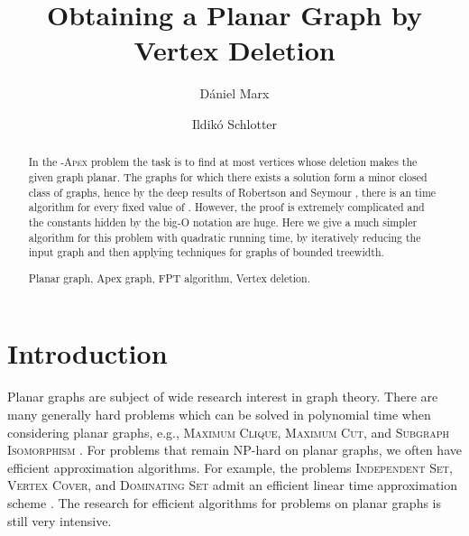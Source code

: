 \documentclass{llncs}
\begin{document}
\mainmatter

\title{Obtaining a Planar Graph by Vertex Deletion}
\author{D\'aniel Marx \and Ildik\'o Schlotter}


\maketitle

\begin{abstract}
In the -\textsc{Apex} problem the task is to find at most  vertices
whose deletion makes the given graph planar.
The graphs for which there exists a solution form a minor closed class of graphs,
hence by the deep results of Robertson and Seymour \cite{sey95,sey04}, there is an  time algorithm
for every fixed value of . However, the proof is extremely complicated and the constants hidden by
the big-O notation are huge.
Here we give a much simpler algorithm for this problem with quadratic running time, by
iteratively reducing the input graph and then applying techniques for graphs of bounded treewidth.

 Planar graph, Apex graph, FPT algorithm, Vertex deletion.
\end{abstract}




\section{Introduction}

Planar graphs are subject of wide research interest in graph theory.
There are many generally hard problems which can be solved in polynomial time when considering planar graphs,
e.g., \textsc{Maximum Clique}, \textsc{Maximum Cut}, and \textsc{Subgraph Isomorphism}
\cite{epp99,had75}.
For problems that remain NP-hard on planar graphs, we often have efficient approximation algorithms.
For example, the problems \textsc{Independent Set, Vertex Cover}, and  \textsc{Dominating Set}
admit an efficient linear time approximation scheme \cite{bak94,lip80}.
The research for efficient algorithms for problems on planar graphs is still very intensive.
\end{document}
